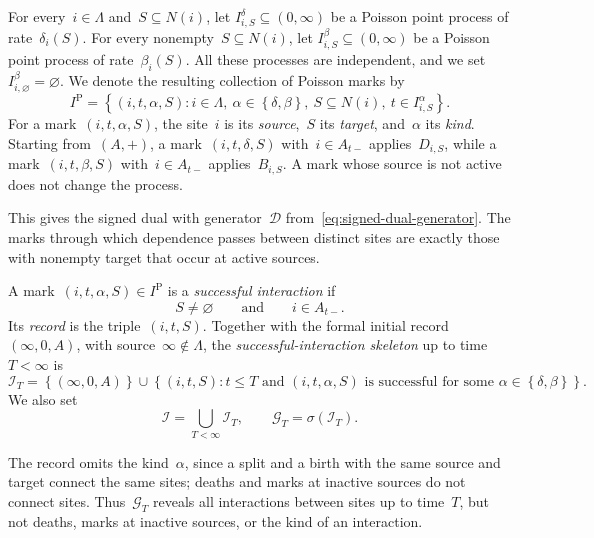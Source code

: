 \documentclass[EJP,preprint,NODS,nobera]{ejpecp}
\newcommand{\bb}[1]{\left(#1\right)}
\newcommand{\cb}[1]{\left\{#1\right\}}
\newcommand{\Dcal}{\mathcal{D}}
\newcommand{\chg}[1]{{\color{changegreen}#1}}
\begin{document}
\chg{\begin{definition}
\label{def:graphical-construction}
For
every~$i\in\Lambda$ and~$S\subseteq N(i)$, let
$I_{i,S}^\delta\subseteq(0,\infty)$ be a Poisson point process of
rate~$\delta_i(S)$. For every nonempty~$S\subseteq N(i)$, let
$I_{i,S}^\beta\subseteq(0,\infty)$ be a Poisson point process of
rate~$\beta_i(S)$. All these processes are independent, and we set
$I_{i,\varnothing}^\beta=\varnothing$. We denote the resulting collection of
Poisson marks by
\begin{equation*}
I^{\mathrm P}
=
\cb{
(i,t,\alpha,S):
i\in\Lambda,\ 
\alpha\in\cb{\delta,\beta},\ 
S\subseteq N(i),\ 
t\in I_{i,S}^\alpha
}.
\end{equation*}
For a mark~$(i,t,\alpha,S)$, the site~$i$ is its \emph{source},~$S$ its
\emph{target}, and~$\alpha$ its \emph{kind}. Starting from~$(A,+)$, a
mark~$(i,t,\delta,S)$ with~$i\in A_{t-}$ applies~$D_{i,S}$, while a
mark~$(i,t,\beta,S)$ with~$i\in A_{t-}$ applies~$B_{i,S}$. A mark whose
source is not active does not change the process.
\end{definition}}
\chg{This gives the signed dual with generator~$\Dcal$
from~\eqref{eq:signed-dual-generator}.} The marks through which dependence passes between distinct sites are exactly
those with nonempty target that occur at active sources.
\begin{definition}[Successful interaction and its record]
\label{def:successful-interaction}
A mark~$(i,t,\alpha,S)\in I^{\mathrm P}$ is a \emph{successful
interaction} if
\begin{equation*}
S\neq\varnothing
\qquad\text{and}\qquad
i\in A_{t-}.
\end{equation*}
Its \emph{record} is the triple~$(i,t,S)$.
\chg{Together with the formal initial record~$(\infty,0,A)$, with
source~$\infty\notin\Lambda$, the \emph{successful-interaction skeleton} up
to time~$T<\infty$ is}
\begin{equation}
\label{eq:successful-interaction-skeleton}
\mathcal I_T
=
\cb{(\infty,0,A)}
\cup
\cb{
(i,t,S):
t\leq T
\text{ and }(i,t,\alpha,S)\text{ is successful for some }
\alpha\in\cb{\delta,\beta}
}.
\end{equation}
\chg{We also set}
\begin{equation*}
\mathcal I
=
\bigcup_{T<\infty}\mathcal I_T,
\qquad
\mathcal G_T
=
\sigma\bb{\mathcal I_T}.
\end{equation*}
\end{definition}

\chg{\begin{remark}
The record omits the kind~$\alpha$, since a split and a birth with the same
source and target connect the same sites; deaths and marks at inactive
sources do not connect sites. Thus~$\mathcal G_T$ reveals all interactions
between sites up to time~$T$, but not deaths, marks at inactive sources, or
the kind of an interaction.
\end{remark}}
\end{document}
